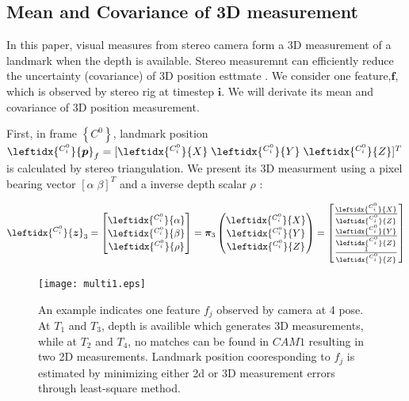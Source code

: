 \documentclass[a4paper, 10pt, conference]{ieeeconf}      %
\begin{document}
\subsection{Mean and Covariance of 3D measurement}

In this paper, visual measures from stereo camera form a 3D measurement of a landmark  when the depth is available. Stereo measuremnt can efficiently reduce the uncertainty (covariance) of 3D position esttmate . We consider one feature,$ \bm f $, which is observed  by  stereo rig at timestep $ \bm {   i }$. We will derivate its mean and covariance of 3D position measurement. 

First, in frame $\left\lbrace C^0 \right\rbrace$, landmark position $ \leftidx{^{C_i^0}}{ { \bm p}}_f  = [  \leftidx{^{C_i^0}}{  X} \; \leftidx{^{C_i^0}}{  Y} \; \leftidx{^{C_i^0}}{  Z} ]^T$  is calculated by stereo triangulation. We present its 3D measurment  using a pixel bearing vector $ [  \alpha \;  \beta ]^T $ and a inverse depth scalar $  \rho $ :

\begin{equation}
\leftidx{^{C_i^0}}{ {\bm { z}}}_3 = \left[ \begin{matrix}  
\leftidx{^{C_i^0}}{ { \alpha}} \\
\leftidx{^{C_i^0}}{ { \beta}} \\
\leftidx{^{C_i^0}}{ { \rho}}
 \end{matrix}\right]  = \bm \pi_3\left(  \begin{matrix}  
 \leftidx{^{C_i^0}}{ { X}} \\
 \leftidx{^{C_i^0}}{ { Y}} \\
 \leftidx{^{C_i^0}}{ { Z}}
 \end{matrix} \right) = \left[ \begin{matrix}  
 \frac{\leftidx{^{C_i^0}}{ {  X}}^{}}{\leftidx{^{C_i^0}}{ {  Z}}^{}}\\
 \frac{\leftidx{^{C_i^0}}{ { Y}}^{}}{\leftidx{^{C_i^0}}{ {   Z}}^{}}\\
 \frac{1}{\leftidx{^{C_i^0}}{ { Z}}^{}}\\
 \end{matrix}\right] 
\end{equation}
\begin{figure}[thpb]
	\centering
	
	\texttt{[image: multi1.eps]}
	
	\caption{ An example indicates one feature $ f_j $ observed by camera at 4 pose. At $ T_1 $ and $ T_3 $, depth is availible which generates 3D measurements, while  at $T_2$ and $T_4$, no matches can be found in $ CAM1 $ resulting in two 2D measurements. Landmark position cooresponding to $ f_j $ is estimated by minimizing either 2d or 3D measurement errors through least-square method.   }
	\label{figurelabel}
\end{figure}
\end{document}
